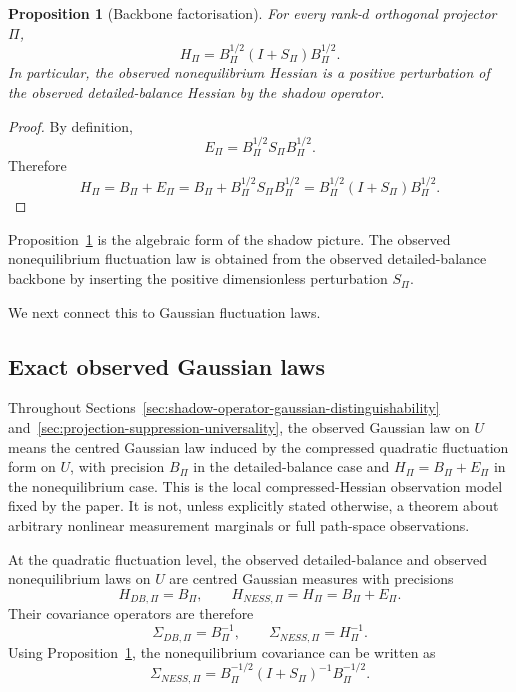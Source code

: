 \documentclass[11pt,a4paper]{article}
\numberwithin{equation}{section}
\theoremstyle{thmcompact}
\newtheorem{proposition}[theorem]{Proposition}
\theoremstyle{remark}
\begin{document}
\begin{proposition}[Backbone factorisation]
\label{prop:backbone_factorisation}
For every rank-\(d\) orthogonal projector \(\Pi\),
\begin{equation}
H_\Pi
=
B_\Pi^{1/2}(I+S_\Pi)B_\Pi^{1/2}.
\end{equation}
In particular, the observed nonequilibrium Hessian is a positive perturbation of the observed detailed-balance Hessian by the shadow operator.
\end{proposition}

\begin{proof}
By definition,
\begin{equation}
E_\Pi=B_\Pi^{1/2}S_\Pi B_\Pi^{1/2}.
\end{equation}
Therefore
\begin{equation}
H_\Pi
=
B_\Pi+E_\Pi
=
B_\Pi+B_\Pi^{1/2}S_\Pi B_\Pi^{1/2}
=
B_\Pi^{1/2}(I+S_\Pi)B_\Pi^{1/2}.
\end{equation}
\end{proof}

Proposition~\ref{prop:backbone_factorisation} is the algebraic form of the shadow picture. The observed nonequilibrium fluctuation law is obtained from the observed detailed-balance backbone by inserting the positive dimensionless perturbation \(S_\Pi\).

We next connect this to Gaussian fluctuation laws.

\subsection{Exact observed Gaussian laws}

Throughout Sections~\ref{sec:shadow-operator-gaussian-distinguishability} and~\ref{sec:projection-suppression-universality}, the observed Gaussian law on \(U\) means the centred Gaussian law induced by the compressed quadratic fluctuation form on \(U\), with precision \(B_\Pi\) in the detailed-balance case and \(H_\Pi=B_\Pi+E_\Pi\) in the nonequilibrium case. This is the local compressed-Hessian observation model fixed by the paper. It is not, unless explicitly stated otherwise, a theorem about arbitrary nonlinear measurement marginals or full path-space observations.

At the quadratic fluctuation level, the observed detailed-balance and observed nonequilibrium laws on \(U\) are centred Gaussian measures with precisions
\begin{equation}
H_{DB,\Pi}=B_\Pi,
\qquad
H_{NESS,\Pi}=H_\Pi=B_\Pi+E_\Pi.
\end{equation}
Their covariance operators are therefore
\begin{equation}
\Sigma_{DB,\Pi}=B_\Pi^{-1},
\qquad
\Sigma_{NESS,\Pi}=H_\Pi^{-1}.
\end{equation}
Using Proposition~\ref{prop:backbone_factorisation}, the nonequilibrium covariance can be written as
\begin{equation}
\Sigma_{NESS,\Pi}
=
B_\Pi^{-1/2}(I+S_\Pi)^{-1}B_\Pi^{-1/2}.
\end{equation}
\end{document}
